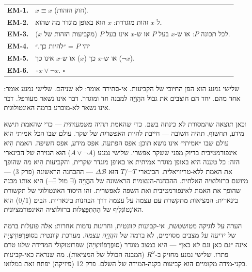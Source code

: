 \documentclass[10pt, openany, oneside]{book}
\renewcommand{\footnotesize}{\fontsize{8.5}{11}\selectfont}
\begin{document}
{\footnotesize
\noindent\begin{tabular}{r p{}}
\textbf{EM-1.} & $x \equiv x$ (חוק הזהות). \\[0.3em]
\textbf{EM-2.} & ל-$x$ זהות מוגדרת: $x$ הוא באופן מוגדר מה שהוא. \\[0.3em]
\textbf{EM-3.} & לכל תכונה $P$: או ש-$x$ בעל $P$ או ש-$x$ אינו בעל $P$ (מקביעות הזהות של $x$). \\[0.3em]
\textbf{EM-4.} & יהי $P$ = ״להיות כך.״ \\[0.3em]
\textbf{EM-5.} & או ש-$x$ כך ($x$) או ש-$x$ אינו כך ($\neg x$). \\[0.3em]
\textbf{EM-6.} & $\therefore x \vee \neg x$. $\square$ \\[0.3em]
\end{tabular}
}

\vspace{0.8em}

\noindent שלישי נמנע הוא הפן החיובי של הקביעות. אי-סתירה אומר: לא שניהם. שלישי נמנע אומר: אחד מהם. יחד הם חוצבים את גבול ההֲוָיָה למבנה חד ומוגדר. דבר אינו נשאר מעורפל. דבר אינו נשאר לא-מוכרע ברמה האונטולוגית.

וכאן תוצאה שהמסורת לא כינתה בשם. כדי שהאמת תהיה \textit{משמעותית} — כדי שהאמת תישא מידע, תחשוף, תהיה חשובה — חייבת להיות ה\textit{אפשרות} של שקר. עולם שבו הכל אמיתי הוּא עולם שבו ״אמיתי״ אינו נושא תוכן: אפס הפתעה, אפס מידע, אפס חשיפה. האמת הִיא אינפורמטיבית בדיוק מפני ששקר אפשרי. שלישי נמנע ($A \vee \neg A$) הוּא הגזירה של הבינארי הזה: כל טענה היא באופן מוגדר אמיתית או באופן מוגדר שקרית, והקביעות הִיא מה שהופך את האמת ללא-טריוויאלית. הבינארי $T/\neg T$ הוּא $\Delta\mathcal{B}$ — ההבחנה הראשונה (פרק 3) — מיושם ברזולוציה האלתית. ההבחנה-העצמית הראשונה של ההֲוָיָה ($\exists$ מול $\neg\exists$) הִיא אותו מבנה שהופך את האמת לאינפורמטיבית ואת השפה לאפשרית. זהו היסוד האונטולוגי של תקשורת בינארית: המציאות מתקשרת עם עצמה על עצמה דרך הבחנות בינאריות. הביט ($0/1$) הוּא האוֹנְטוֹגְלִיף של הַהִתְפַּצְּלוּת ברזולוציה האינפורמציונית.

הערה על לוגיקה מטושטשת, אי-קביעות קוונטית, וחריגות נדמות אחרות: אלה פועלות ברמה של \textit{ידיעה על} מצבים מסוימים, לא ברמה של \textit{ההֲוָיָה עצמה}. מערכת קוונטית בסוּפֶּרְפּוֹזִיצְיָה אינה ״גם כאן וגם לא כאן״ — היא במצב מוגדר (סוּפֶּרְפּוֹזִיצְיָה) שפרוטוקולי המדידה שלנו טרם פתרו. שלישי נמנע מחזיק ב-$R^\omega$ (המבנה הכולל של המציאות). מה שנראה כאי-קביעות בקני-מידה מקומיים הוא קביעות בקנה-המידה של השלם. פרק 12 (פיזיקה) יפתח זאת במלואו.

\vspace{1.5em}
\end{document}

